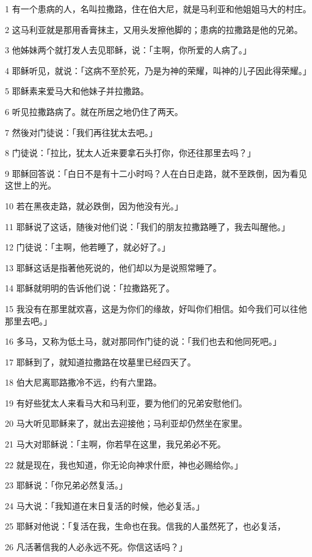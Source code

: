 \par 1 有一个患病的人，名叫拉撒路，住在伯大尼，就是马利亚和他姐姐马大的村庄。
\par 2 这马利亚就是那用香膏抹主，又用头发擦他脚的；患病的拉撒路是他的兄弟。
\par 3 他姊妹两个就打发人去见耶稣，说：「主啊，你所爱的人病了。」
\par 4 耶稣听见，就说：「这病不至於死，乃是为神的荣耀，叫神的儿子因此得荣耀。」
\par 5 耶稣素来爱马大和他妹子并拉撒路。
\par 6 听见拉撒路病了。就在所居之地仍住了两天。
\par 7 然後对门徒说：「我们再往犹太去吧。」
\par 8 门徒说：「拉比，犹太人近来要拿石头打你，你还往那里去吗？」
\par 9 耶稣回答说：「白日不是有十二小时吗？人在白日走路，就不至跌倒，因为看见这世上的光。
\par 10 若在黑夜走路，就必跌倒，因为他没有光。」
\par 11 耶稣说了这话，随後对他们说：「我们的朋友拉撒路睡了，我去叫醒他。」
\par 12 门徒说：「主啊，他若睡了，就必好了。」
\par 13 耶稣这话是指著他死说的，他们却以为是说照常睡了。
\par 14 耶稣就明明的告诉他们说：「拉撒路死了。
\par 15 我没有在那里就欢喜，这是为你们的缘故，好叫你们相信。如今我们可以往他那里去吧。」
\par 16 多马，又称为低土马，就对那同作门徒的说：「我们也去和他同死吧。」
\par 17 耶稣到了，就知道拉撒路在坟墓里已经四天了。
\par 18 伯大尼离耶路撒冷不远，约有六里路。
\par 19 有好些犹太人来看马大和马利亚，要为他们的兄弟安慰他们。
\par 20 马大听见耶稣来了，就出去迎接他；马利亚却仍然坐在家里。
\par 21 马大对耶稣说：「主啊，你若早在这里，我兄弟必不死。
\par 22 就是现在，我也知道，你无论向神求什麽，神也必赐给你。」
\par 23 耶稣说：「你兄弟必然复活。」
\par 24 马大说：「我知道在末日复活的时候，他必复活。」
\par 25 耶稣对他说：「复活在我，生命也在我。信我的人虽然死了，也必复活，
\par 26 凡活著信我的人必永远不死。你信这话吗？」
